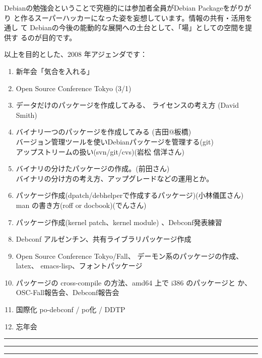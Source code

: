 \documentclass[mingoth,a4paper]{jsarticle}
\begin{document}
 Debianの勉強会ということで究極的には参加者全員がDebian Packageをがりがり
 と作るスーパーハッカーになった姿を妄想しています。情報の共有・活用を通し
 て Debianの今後の能動的な展開への土台として、「場」としての空間を提供す
 るのが目的です。

以上を目的とした、2008 年アジェンダです：
\begin{enumerate}
 \item 新年会「気合を入れる」
 \item Open Source Conference Tokyo (3/1)
 \item データだけのパッケージを作成してみる、
       ライセンスの考え方 (David Smith)
 \item バイナリ一つのパッケージを作成してみる (吉田@板橋)\\
       バージョン管理ツールを使いDebianパッケージを管理する(git)\\
       アップストリームの扱い(svn/git/cvs)(岩松 信洋さん)
 \item バイナリの分けたパッケージの作成。(前田さん)\\
       バイナリの分け方の考え方、アップグレードなどの運用とか。
 \item パッケージ作成(dpatch/debhelperで作成するパッケージ)(小林儀匡さん)\\
       man の書き方(roff or docbook)(でんさん)
 \item パッケージ作成(kernel patch、kernel module)
       、Debconf発表練習
 \item Debconf アルゼンチン、共有ライブラリパッケージ作成

 \item Open Source Conference Tokyo/Fall、
       デーモン系のパッケージの作成、latex、 emacs-lisp、フォントパッケージ
 \item パッケージの cross-compile の方法、amd64 上で i386 のパッケージと
       か、OSC-Fall報告会、Debconf報告会
 \item 国際化 po-debconf / po化 / DDTP
 \item 忘年会
\end{enumerate}


\newpage

\begin{minipage}[b]{0.2\hsize}
 \colorbox{titleback}{}
\end{minipage}
\begin{minipage}[b]{0.8\hsize}
\hrule
\vspace{2mm}
\hrule
\setcounter{tocdepth}{1}
\tableofcontents
\vspace{2mm}
\hrule
\end{minipage}
\end{document}

